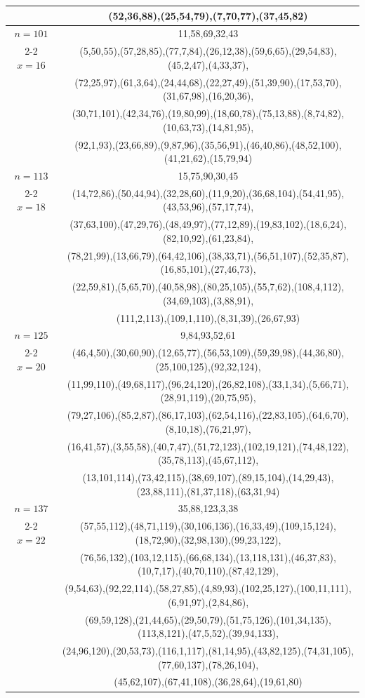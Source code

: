 \begin{tabular}{| c | c |}
&(52,36,88),(25,54,79),(7,70,77),(37,45,82)\\
\hline 
\(n=101\) & 
11,58,69,32,43\\
\cline{2-2}
\(x=16\)
&(5,50,55),(57,28,85),(77,7,84),(26,12,38),(59,6,65),(29,54,83),(45,2,47),(4,33,37),\\
&(72,25,97),(61,3,64),(24,44,68),(22,27,49),(51,39,90),(17,53,70),(31,67,98),(16,20,36),\\
&(30,71,101),(42,34,76),(19,80,99),(18,60,78),(75,13,88),(8,74,82),(10,63,73),(14,81,95),\\
&(92,1,93),(23,66,89),(9,87,96),(35,56,91),(46,40,86),(48,52,100),(41,21,62),(15,79,94)\\
\hline 
\(n=113\) & 
15,75,90,30,45\\
\cline{2-2}
\(x=18\)
&(14,72,86),(50,44,94),(32,28,60),(11,9,20),(36,68,104),(54,41,95),(43,53,96),(57,17,74),\\
&(37,63,100),(47,29,76),(48,49,97),(77,12,89),(19,83,102),(18,6,24),(82,10,92),(61,23,84),\\
&(78,21,99),(13,66,79),(64,42,106),(38,33,71),(56,51,107),(52,35,87),(16,85,101),(27,46,73),\\
&(22,59,81),(5,65,70),(40,58,98),(80,25,105),(55,7,62),(108,4,112),(34,69,103),(3,88,91),\\
&(111,2,113),(109,1,110),(8,31,39),(26,67,93)\\
\hline 
\(n=125\) & 
9,84,93,52,61\\
\cline{2-2}
\(x=20\)
&(46,4,50),(30,60,90),(12,65,77),(56,53,109),(59,39,98),(44,36,80),(25,100,125),(92,32,124),\\
&(11,99,110),(49,68,117),(96,24,120),(26,82,108),(33,1,34),(5,66,71),(28,91,119),(20,75,95),\\
&(79,27,106),(85,2,87),(86,17,103),(62,54,116),(22,83,105),(64,6,70),(8,10,18),(76,21,97),\\
&(16,41,57),(3,55,58),(40,7,47),(51,72,123),(102,19,121),(74,48,122),(35,78,113),(45,67,112),\\
&(13,101,114),(73,42,115),(38,69,107),(89,15,104),(14,29,43),(23,88,111),(81,37,118),(63,31,94)\\
\hline 
\(n=137\) & 
35,88,123,3,38\\
\cline{2-2}
\(x=22\)
&(57,55,112),(48,71,119),(30,106,136),(16,33,49),(109,15,124),(18,72,90),(32,98,130),(99,23,122),\\
&(76,56,132),(103,12,115),(66,68,134),(13,118,131),(46,37,83),(10,7,17),(40,70,110),(87,42,129),\\
&(9,54,63),(92,22,114),(58,27,85),(4,89,93),(102,25,127),(100,11,111),(6,91,97),(2,84,86),\\
&(69,59,128),(21,44,65),(29,50,79),(51,75,126),(101,34,135),(113,8,121),(47,5,52),(39,94,133),\\
&(24,96,120),(20,53,73),(116,1,117),(81,14,95),(43,82,125),(74,31,105),(77,60,137),(78,26,104),\\
&(45,62,107),(67,41,108),(36,28,64),(19,61,80)\\
\hline 
\end{tabular}